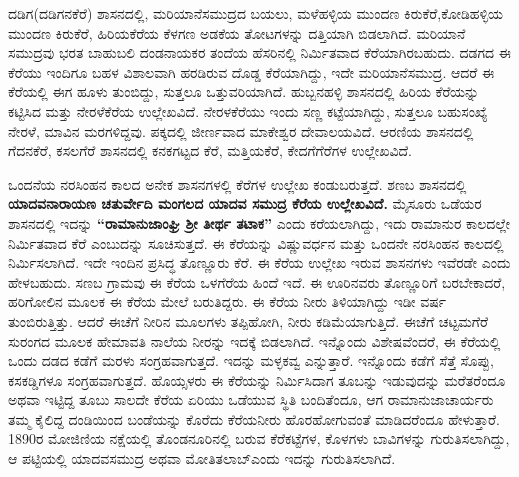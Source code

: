 ದಡಿಗ(ದಡಿಗನಕೆರೆ) ಶಾಸನದಲ್ಲಿ, ಮರಿಯಾನೆಸಮುದ್ರದ ಬಯಲು, ಮಳೆಹಳ್ಳಿಯ ಮುಂದಣ ಕಿರುಕೆರೆ,\break ಕೋಡಿಹಳ್ಳಿಯ ಮುಂದಣ ಕಿರುಕೆರೆ, ಹಿರಿಯಕೆರೆಯ ಕೆಳಗಣ ಅಡಕೆಯ ತೋಟಗಳನ್ನು ದತ್ತಿಯಾಗಿ ಬಿಡಲಾಗಿದೆ. ಮರಿಯಾನೆ ಸಮುದ್ರವು ಭರತ ಬಾಹುಬಲಿ ದಂಡನಾಯಕರ ತಂದೆಯ ಹೆಸರಿನಲ್ಲಿ ನಿರ್ಮಿತವಾದ ಕೆರೆಯಾಗಿರಬಹುದು. ದಡಗದ ಈ ಕೆರೆಯು ಇಂದಿಗೂ ಬಹಳ ವಿಶಾಲವಾಗಿ ಹರಡಿರುವ ದೊಡ್ಡ ಕೆರೆಯಾಗಿದ್ದು, ಇದೇ ಮರಿಯಾನೆಸಮುದ್ರ. ಆದರೆ ಈ ಕೆರೆಯಲ್ಲಿ ಈಗ ಹೂಳು ತುಂಬಿದ್ದು, ಸುತ್ತಲೂ ಒತ್ತುವರಿಯಾಗಿದೆ. ಹುಬ್ಬನಹಳ್ಳಿ ಶಾಸನದಲ್ಲಿ ಹಿರಿಯ ಕೆರೆಯನ್ನು ಕಟ್ಟಿಸಿದ ಮತ್ತು ನೇರಳೆಕೆರೆಯ ಉಲ್ಲೇಖವಿದೆ. ನೇರಳಕೆರೆಯು ಇಂದು ಸಣ್ಣ ಕಟ್ಟೆಯಾಗಿದ್ದು, ಸುತ್ತಲೂ ಬಹುಸಂಖ್ಯೆ ನೇರಳೆ, ಮಾವಿನ ಮರಗಳಿದ್ದವು. ಪಕ್ಕದಲ್ಲಿ ಜೀರ್ಣವಾದ ಮಾಕೇಶ್ವರ ದೇವಾಲಯವಿದೆ.  ಆರಣಿಯ ಶಾಸನದಲ್ಲಿ ಗೆದನಕೆರೆ, ಕಸಲಗೆರೆ ಶಾಸನದಲ್ಲಿ ಕನಕಗಟ್ಟದ ಕೆರೆ, ಮತ್ತಿಯಕೆರೆ, ಕೇದಗೆಗೆರೆಗಳ ಉಲ್ಲೇಖವಿದೆ.

ಒಂದನೆಯ ನರಸಿಂಹನ ಕಾಲದ ಅನೇಕ ಶಾಸನಗಳಲ್ಲಿ ಕೆರೆಗಳ ಉಲ್ಲೇಖ ಕಂಡುಬರುತ್ತದೆ. ಶಣಬ ಶಾಸನದಲ್ಲಿ \textbf{ಯಾದವನಾರಾಯಣ ಚತುರ್ವೇದಿ ಮಂಗಲದ ಯಾದವ ಸಮುದ್ರ ಕೆರೆಯ ಉಲ್ಲೇಖವಿದೆ.} ಮೈಸೂರು ಒಡೆಯರ ಶಾಸನದಲ್ಲಿ ಇದನ್ನು \textbf{“ರಾಮಾನುಜಾಂಘ್ರಿ ಶ‍್ರೀ ತೀರ್ಥ ತಟಾಕ”} ಎಂದು ಕರೆಯಲಾಗಿದ್ದು, ಇದು ರಾಮಾನುರ ಕಾಲದಲ್ಲೇ ನಿರ್ಮಿತವಾದ ಕೆರೆ ಎಂಬುದನ್ನು ಸೂಚಿಸುತ್ತದೆ. ಈ ಕೆರೆಯನ್ನು ವಿಷ್ಣುವರ್ಧನ ಮತ್ತು ಒಂದನೇ ನರಸಿಂಹನ ಕಾಲದಲ್ಲಿ ನಿರ್ಮಿಸಲಾಗಿದೆ. ಇದೇ ಇಂದಿನ ಪ್ರಸಿದ್ಧ ತೊಣ್ಣೂರು ಕೆರೆ. ಈ ಕೆರೆಯ ಉಲ್ಲೇಖ ಇರುವ ಶಾಸನಗಳು ಇವೆರಡೇ ಎಂದು ಹೇಳಬಹುದು. ಸಣಬ ಗ್ರಾಮವು ಈ ಕೆರೆಯ ಒಳಗೆರೆಯ ಹಿಂದೆ ಇದೆ. ಈ ಊರಿನವರು ತೊಣ್ಣೂರಿಗೆ ಬರಬೇಕಾದರೆ, ಹರಿಗೋಲಿನ ಮೂಲಕ ಈ ಕೆರೆಯ ಮೇಲೆ ಬರುತಿದ್ದರು. ಈ ಕೆರೆಯ ನೀರು ತಿಳಿಯಾಗಿದ್ದು ಇಡೀ ವರ್ಷ ತುಂಬಿರುತ್ತಿತ್ತು. ಆದರೆ ಈಚೆಗೆ ನೀರಿನ ಮೂಲಗಳು ತಪ್ಪಿಹೋಗಿ, ನೀರು ಕಡಿಮೆಯಾಗುತ್ತಿದೆ. ಈಚೆಗೆ ಚಟ್ಟಮಗೆರೆ ಸುರಂಗದ ಮೂಲಕ ಹೇಮಾವತಿ ನಾಲೆಯ ನೀರನ್ನು ಇದಕ್ಕೆ ಬಿಡಲಾಗಿದೆ. ಇನ್ನೊಂದು ವಿಶೇಷವೆಂದರೆ, ಈ ಕೆರೆಯಲ್ಲಿ ಒಂದು ದಡದ ಕಡೆಗೆ ಮರಳು ಸಂಗ್ರಹವಾಗುತ್ತದೆ. ಇದನ್ನು ಮಳ್ಳಕವ್ವ ಎನ್ನುತ್ತಾರೆ. ಇನ್ನೊಂದು ಕಡೆಗೆ ಸೆತ್ತೆ ಸೊಪ್ಪು, ಕಸಕಡ್ಡಿಗಳೂ ಸಂಗ್ರಹವಾಗುತ್ತದೆ. ಹೊಯ್ಸಳರು ಈ ಕೆರೆಯನ್ನು ನಿರ್ಮಿಸಿದಾಗ ತೂಬನ್ನು ಇಡುವುದನ್ನು ಮರೆತರೆಂದೂ ಅಥವಾ ಇಟ್ಟಿದ್ದ ತೂಬು ಸಾಲದೇ ಕೆರೆಯ ಏರಿಯು ಒಡೆಯುವ ಸ್ಥಿತಿ ಬಂದಿತೆಂದೂ, ಆಗ ರಾಮಾನುಜಾಚಾರ್ಯರು ತಮ್ಮ ಕೈಲಿದ್ದ ದಂಡಿಯಿಂದ ಬಂಡೆಯನ್ನು ಕೊರೆದು ಕೆರೆಯನೀರು ಹೊರಹೋಗುವಂತೆ ಮಾಡಿದರೆಂದೂ ಹೇಳುತ್ತಾರೆ. 1890ರ ಮೋಜಿಣಿಯ ನಕ್ಷೆಯಲ್ಲಿ ತೊಂಡನೂರಿನಲ್ಲಿ ಬರುವ ಕೆರೆಕಟ್ಟೆಗಳ, ಕೊಳಗಳು ಬಾವಿಗಳನ್ನು ಗುರುತಿಸಲಾಗಿದ್ದು, ಆ ಪಟ್ಟಿಯಲ್ಲಿ ಯಾದವಸಮುದ್ರ ಅಥವಾ ಮೋತಿತಲಾಬ್​ ಎಂದು ಇದನ್ನು ಗುರುತಿಸಲಾಗಿದೆ.

